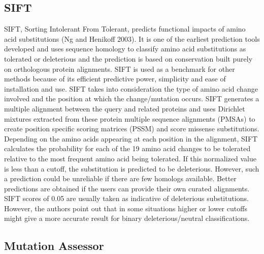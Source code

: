 \documentclass[10pt,letterpaper]{article}
\begin{document}
\subsection{SIFT}

SIFT, Sorting Intolerant From Tolerant, predicts functional impacts of
amino acid substitutions (Ng and Henikoff 2003). It is one of the
earliest prediction tools developed and uses sequence homology to
classify amino acid substitutions as tolerated or deleterious and the
prediction is based on conservation built purely on orthologous
protein alignments. SIFT is used as a benchmark for other methods
because of its efficient predictive power, simplicity and ease of
installation and use. SIFT takes into consideration the type of amino
acid change involved and the position at which the change/mutation
occurs. SIFT generates a multiple alignment between the query and
related proteins and uses Dirichlet mixtures extracted from these
protein multiple sequence alignments (PMSAs) to create position
specific scoring matrices (PSSM) and score missense
substitutions. Depending on the amino acids appearing at each position
in the alignment, SIFT calculates the probability for each of the 19
amino acid changes to be tolerated relative to the most frequent amino
acid being tolerated. If this normalized value is less than a cutoff,
the substitution is predicted to be deleterious. However, such a
prediction could be unreliable if there are few homologs
available. Better predictions are obtained if the users can provide
their own curated alignments. SIFT scores of 0.05 are usually taken as
indicative of deleterious substitutions. However, the authors point
out that in some situations higher or lower cutoffs might give a more
accurate result for binary deleterious/neutral classifications.


\subsection{Mutation Assessor}
\end{document}
